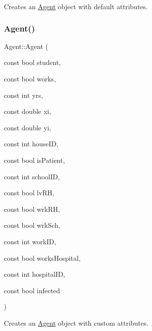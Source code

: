 Creates an \hyperlink{classAgent}{Agent} object with default attributes. 

\mbox{\label{classAgent_a8b2a1eebca05ea3ac1a9b6dc1fc4681f}} 
\subsubsection{\texorpdfstring{Agent()}{Agent()}\hspace{0.1cm}{\footnotesize\ttfamily [2/2]}}
{\footnotesize\ttfamily Agent\+::\+Agent (\begin{DoxyParamCaption}\item[{const bool}]{student,  }\item[{const bool}]{works,  }\item[{const int}]{yrs,  }\item[{const double}]{xi,  }\item[{const double}]{yi,  }\item[{const int}]{house\+ID,  }\item[{const bool}]{is\+Patient,  }\item[{const int}]{school\+ID,  }\item[{const bool}]{lv\+RH,  }\item[{const bool}]{wrk\+RH,  }\item[{const bool}]{wrk\+Sch,  }\item[{const int}]{work\+ID,  }\item[{const bool}]{works\+Hospital,  }\item[{const int}]{hospital\+ID,  }\item[{const bool}]{infected }\end{DoxyParamCaption})\hspace{0.3cm}{\ttfamily [inline]}}



Creates an \hyperlink{classAgent}{Agent} object with custom attributes. 


